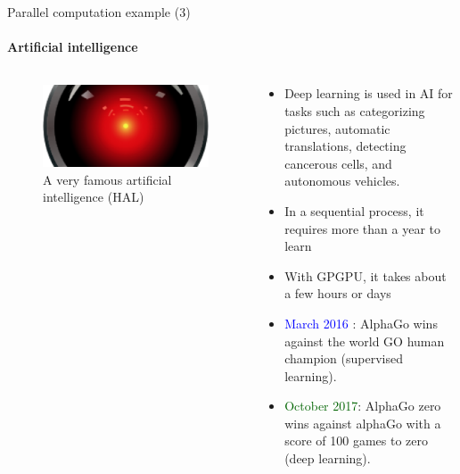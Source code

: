 \documentclass[compress,10pt,aspectratio=169]{beamer}
\begin{document}
\begin{frame}[fragile]{Parallel computation example (3)}
    \framesubtitle{Artificial intelligence}
    \small
    \begin{columns}
        \begin{column}{.5\textwidth}
            \begin{figure}[h]
                \includegraphics[width=\linewidth]{../images/HAL.png}
                \caption{A very famous artificial intelligence (HAL)}
            \end{figure}        
        \end{column}
        \begin{column}{.5\textwidth}
            \begin{itemize}
                \item Deep learning is used in AI for tasks such as categorizing pictures, automatic translations, detecting cancerous cells, and autonomous vehicles.
                \item In a sequential process, it requires more than a year to learn
                \item With GPGPU, it takes about a few hours or days
                \item \textcolor{blue}{March 2016} : AlphaGo wins against the world GO human champion (supervised learning).
                \item \textcolor{DarkGreen}{October 2017}: AlphaGo zero wins against alphaGo with a score of 100 games to zero (deep learning).
            \end{itemize}            
        \end{column}
    \end{columns}
\end{frame}
\end{document}
